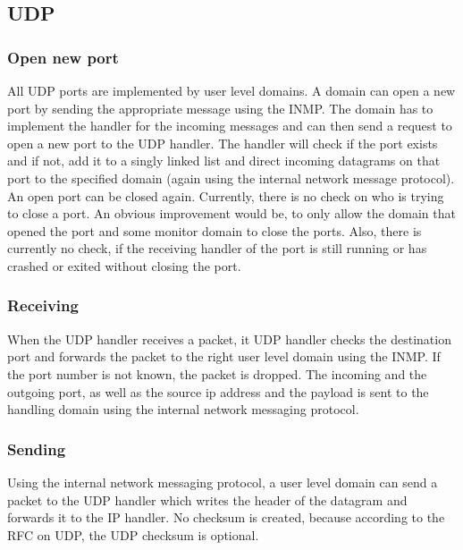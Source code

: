 \subsection{UDP}
\subsubsection{Open new port}
All UDP ports are implemented by user level domains. A domain can open a new port by sending the appropriate message using the INMP. The domain has to implement the handler for the incoming messages and can then send a request to open a new port to the UDP handler. The handler will check if the port exists and if not, add it to a singly linked list and direct incoming datagrams on that port to the specified domain (again using the internal network message protocol). An open port can be closed again. Currently, there is no check on who is trying to close a port. An obvious improvement would be, to only allow the domain that opened the port and some monitor domain to close the ports. Also, there is currently no check, if the receiving handler of the port is still running or has crashed or exited without closing the port.

\subsubsection{Receiving}
When the UDP handler receives a packet, it UDP handler checks the destination port and forwards the packet to the right user level domain using the INMP. If the port number is not known, the packet is dropped. The incoming and the outgoing port, as well as the source ip address and the payload is sent to the handling domain using the internal network messaging protocol.
\subsubsection{Sending}
Using the internal network messaging protocol, a user level domain can send a packet to the UDP handler which writes the header of the datagram and forwards it to the IP handler. No checksum is created, because according to the RFC on UDP, the UDP checksum is optional.\cite{RFC0768}

